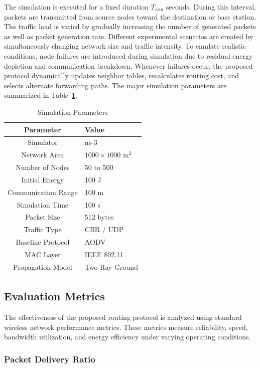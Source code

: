 \documentclass[a4paper,fleqn]{cas-dc}
\numberwithin{equation}{section}
\begin{document}
The simulation is executed for a fixed duration $T_{sim}$ seconds. During this interval, packets are transmitted from source nodes toward the destination or base station. The traffic load is varied by gradually increasing the number of generated packets as well as packet generation rate. Different experimental scenarios are created by simultaneously changing network size and traffic intensity. To emulate realistic conditions, node failures are introduced during simulation due to residual energy depletion and communication breakdown. Whenever failures occur, the proposed protocol dynamically updates neighbor tables, recalculates routing cost, and selects alternate forwarding paths. The major simulation parameters are summarized in Table~\ref{tab:simparams}.

\begin{table}[h]
\centering
\caption{Simulation Parameters}
\label{tab:simparams}
\renewcommand{\arraystretch}{1.2}
\begin{tabular}{|c|p{4.5cm}|}
\hline
\textbf{Parameter} & \textbf{Value} \\
\hline
Simulator & ns-3 \\
Network Area & $1000 \times 1000$ m$^2$ \\
Number of Nodes & 50 to 500 \\
Initial Energy & 100 J \\
Communication Range & 100 m \\
Simulation Time & 100 s \\
Packet Size & 512 bytes \\
Traffic Type & CBR / UDP \\
Baseline Protocol & AODV \\
MAC Layer & IEEE 802.11 \\
Propagation Model & Two-Ray Ground \\
\hline
\end{tabular}
\end{table}

\subsection{Evaluation Metrics}

The effectiveness of the proposed routing protocol is analyzed using standard wireless network performance metrics. These metrics measure reliability, speed, bandwidth utilization, and energy efficiency under varying operating conditions.

\subsubsection{Packet Delivery Ratio}
\end{document}
